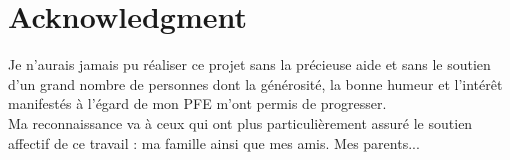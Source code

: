 \documentclass[a4paper, oneside, 12pt, final]{extreport}
\newcommand{\studyDepartment} {%
  Entreprise d'accueil 
  
}
\begin{document}
\chapter*{Acknowledgment}
\thispagestyle{empty}
%

Je n'aurais jamais pu réaliser ce projet sans la précieuse aide et sans le soutien d'un grand nombre de personnes dont la générosité, la bonne humeur et l'intérêt manifestés à l'égard de mon PFE m'ont permis de progresser. \\




Ma reconnaissance va à ceux qui ont plus particulièrement assuré le soutien affectif de ce travail : ma famille ainsi que mes amis. Mes parents... 



\end{document}
